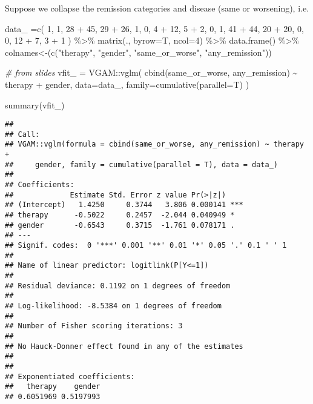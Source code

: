 \documentclass[
]{article}
\newenvironment{Shaded}{\begin{snugshade}}{\end{snugshade}}
\newcommand{\AttributeTok}[1]{\textcolor[rgb]{0.77,0.63,0.00}{#1}}
\newcommand{\CommentTok}[1]{\textcolor[rgb]{0.56,0.35,0.01}{\textit{#1}}}
\newcommand{\DecValTok}[1]{\textcolor[rgb]{0.00,0.00,0.81}{#1}}
\newcommand{\FunctionTok}[1]{\textcolor[rgb]{0.00,0.00,0.00}{#1}}
\newcommand{\NormalTok}[1]{#1}
\newcommand{\OtherTok}[1]{\textcolor[rgb]{0.56,0.35,0.01}{#1}}
\newcommand{\SpecialCharTok}[1]{\textcolor[rgb]{0.00,0.00,0.00}{#1}}
\newcommand{\StringTok}[1]{\textcolor[rgb]{0.31,0.60,0.02}{#1}}
\begin{document}
Suppose we collapse the remission categories and disease (same or
worsening), i.e.

\begin{Shaded}
\begin{Highlighting}[]
\NormalTok{data\_ }\OtherTok{=}\FunctionTok{c}\NormalTok{(}
  \DecValTok{1}\NormalTok{, }\DecValTok{1}\NormalTok{, }\DecValTok{28} \SpecialCharTok{+} \DecValTok{45}\NormalTok{, }\DecValTok{29} \SpecialCharTok{+}  \DecValTok{26}\NormalTok{,}
  \DecValTok{1}\NormalTok{, }\DecValTok{0}\NormalTok{, }\DecValTok{4} \SpecialCharTok{+}  \DecValTok{12}\NormalTok{, }\DecValTok{5} \SpecialCharTok{+} \DecValTok{2}\NormalTok{,}
  \DecValTok{0}\NormalTok{, }\DecValTok{1}\NormalTok{, }\DecValTok{41} \SpecialCharTok{+} \DecValTok{44}\NormalTok{, }\DecValTok{20} \SpecialCharTok{+}  \DecValTok{20}\NormalTok{,}
  \DecValTok{0}\NormalTok{, }\DecValTok{0}\NormalTok{, }\DecValTok{12} \SpecialCharTok{+} \DecValTok{7}\NormalTok{, }\DecValTok{3} \SpecialCharTok{+} \DecValTok{1}
\NormalTok{) }\SpecialCharTok{\%\textgreater{}\%}
  \FunctionTok{matrix}\NormalTok{(., }\AttributeTok{byrow=}\NormalTok{T, }\AttributeTok{ncol=}\DecValTok{4}\NormalTok{) }\SpecialCharTok{\%\textgreater{}\%}
  \FunctionTok{data.frame}\NormalTok{() }\SpecialCharTok{\%\textgreater{}\%}
  \StringTok{\textasciigrave{}}\AttributeTok{colnames\textless{}{-}}\StringTok{\textasciigrave{}}\NormalTok{(}\FunctionTok{c}\NormalTok{(}\StringTok{"therapy"}\NormalTok{, }\StringTok{"gender"}\NormalTok{, }\StringTok{"same\_or\_worse"}\NormalTok{, }\StringTok{"any\_remission"}\NormalTok{))}

\CommentTok{\# from slides}
\NormalTok{vfit\_ }\OtherTok{=}\NormalTok{ VGAM}\SpecialCharTok{::}\FunctionTok{vglm}\NormalTok{(}
  \FunctionTok{cbind}\NormalTok{(same\_or\_worse, any\_remission) }\SpecialCharTok{\textasciitilde{}}\NormalTok{ therapy }\SpecialCharTok{+}\NormalTok{ gender,}
  \AttributeTok{data=}\NormalTok{data\_,}
  \AttributeTok{family=}\FunctionTok{cumulative}\NormalTok{(}\AttributeTok{parallel=}\NormalTok{T)}
\NormalTok{)}

\FunctionTok{summary}\NormalTok{(vfit\_)}
\end{Highlighting}
\end{Shaded}

\begin{verbatim}
## 
## Call:
## VGAM::vglm(formula = cbind(same_or_worse, any_remission) ~ therapy + 
##     gender, family = cumulative(parallel = T), data = data_)
## 
## Coefficients: 
##             Estimate Std. Error z value Pr(>|z|)    
## (Intercept)   1.4250     0.3744   3.806 0.000141 ***
## therapy      -0.5022     0.2457  -2.044 0.040949 *  
## gender       -0.6543     0.3715  -1.761 0.078171 .  
## ---
## Signif. codes:  0 '***' 0.001 '**' 0.01 '*' 0.05 '.' 0.1 ' ' 1
## 
## Name of linear predictor: logitlink(P[Y<=1]) 
## 
## Residual deviance: 0.1192 on 1 degrees of freedom
## 
## Log-likelihood: -8.5384 on 1 degrees of freedom
## 
## Number of Fisher scoring iterations: 3 
## 
## No Hauck-Donner effect found in any of the estimates
## 
## 
## Exponentiated coefficients:
##   therapy    gender 
## 0.6051969 0.5197993
\end{verbatim}
\end{document}
